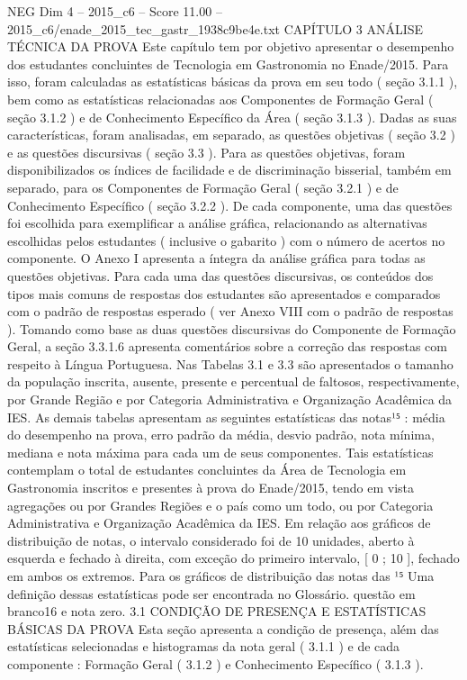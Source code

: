 \begin{textsample}{NEG Dim 4 – 2015\_c6 – Score 11.00 – 2015\_c6/enade\_2015\_tec\_gastr\_1938c9be4e.txt}  \label{ex:f4_neg_334}
CAPÍTULO 3 ANÁLISE TÉCNICA DA PROVA Este capítulo tem por objetivo apresentar o desempenho dos estudantes concluintes de Tecnologia em Gastronomia no Enade/2015.
Para isso, foram calculadas as estatísticas básicas da prova em seu todo ( seção 3.1.1 ), bem como as estatísticas relacionadas aos Componentes de Formação Geral ( seção 3.1.2 ) e de Conhecimento Específico da Área ( seção 3.1.3 ).
Dadas as suas características, foram analisadas, em separado, as questões objetivas ( seção 3.2 ) e as questões discursivas ( seção 3.3 ).
Para as questões objetivas, foram disponibilizados os índices de facilidade e de discriminação bisserial, também em separado, para os Componentes de Formação Geral ( seção 3.2.1 ) e de Conhecimento Específico ( seção 3.2.2 ).
De cada componente, uma das questões foi escolhida para exemplificar a análise gráfica, relacionando as alternativas escolhidas pelos estudantes ( inclusive o gabarito ) com o número de acertos no componente.
O Anexo I apresenta a íntegra da análise gráfica para todas as questões objetivas.
Para cada uma das questões discursivas, os conteúdos dos tipos mais comuns de respostas dos estudantes são apresentados e comparados com o padrão de respostas esperado ( ver Anexo VIII com o padrão de respostas ).
Tomando como base as duas questões discursivas do Componente de Formação Geral, a seção 3.3.1.6 apresenta comentários sobre a correção das respostas com respeito à Língua Portuguesa.
Nas Tabelas 3.1 e 3.3 são apresentados o tamanho da população inscrita, ausente, presente e percentual de faltosos, respectivamente, por Grande Região e por Categoria Administrativa e Organização Acadêmica da IES.
As demais tabelas apresentam as seguintes estatísticas das notas¹⁵ : média do desempenho na prova, erro padrão da média, desvio padrão, nota mínima, mediana e nota máxima para cada um de seus componentes.
Tais estatísticas contemplam o total de estudantes concluintes da Área de Tecnologia em Gastronomia inscritos e presentes à prova do Enade/2015, tendo em vista agregações ou por Grandes Regiões e o país como um todo, ou por Categoria Administrativa e Organização Acadêmica da IES.
Em relação aos gráficos de distribuição de notas, o intervalo considerado foi de 10 unidades, aberto à esquerda e fechado à direita, com exceção do primeiro intervalo, [ 0 ; 10 ], fechado em ambos os extremos.
Para os gráficos de distribuição das notas das ¹⁵ Uma definição dessas estatísticas pode ser encontrada no Glossário. questão em branco16 e nota zero. 3.1 CONDIÇÃO DE PRESENÇA E ESTATÍSTICAS BÁSICAS DA PROVA Esta seção apresenta a condição de presença, além das estatísticas selecionadas e histogramas da nota geral ( 3.1.1 ) e de cada componente : Formação Geral ( 3.1.2 ) e Conhecimento Específico ( 3.1.3 ).

\end{textsample}
